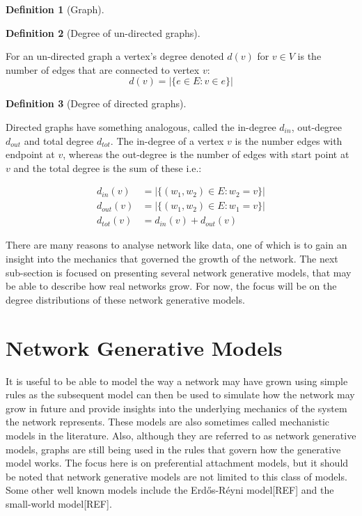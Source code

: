 \documentclass[
  10pt,
  a4paper,
]{scrreprt}
\theoremstyle{plain}
\theoremstyle{plain}
\theoremstyle{definition}
\newtheorem{definition}{Definition}[section]
\theoremstyle{plain}
\theoremstyle{remark}
\begin{document}
{\begin{definition}[Graph]
\end{definition}

\begin{definition}[Degree of un-directed
graphs]\protect\hypertarget{def-deg}{}\label{def-deg}

For an un-directed graph a vertex's degree denoted \(d(v)\) for
\(v\in V\) is the number of edges that are connected to vertex \(v\): \[
d(v) = |\{e\in E : v \in e\}|
\]

\end{definition}

\begin{definition}[Degree of directed
graphs]\protect\hypertarget{def-dirdeg}{}\label{def-dirdeg}

Directed graphs have something analogous, called the in-degree
\(d_{in}\), out-degree \(d_{out}\) and total degree \(d_{tot}\). The
in-degree of a vertex \(v\) is the number edges with endpoint at \(v\),
whereas the out-degree is the number of edges with start point at \(v\)
and the total degree is the sum of these i.e.:

\begin{align*}
d_{in}(v)&= |\{(w_1,w_2)\in E: w_2=v \}|\\
d_{out}(v) &= |\{(w_1,w_2)\in E: w_1=v \}|\\
d_{tot}(v) &= d_{in}(v) + d_{out}(v)
\end{align*}

\end{definition}

There are many reasons to analyse network like data, one of which is to
gain an insight into the mechanics that governed the growth of the
network. The next sub-section is focused on presenting several network
generative models, that may be able to describe how real networks grow.
For now, the focus will be on the degree distributions of these network
generative models.

\hypertarget{sec-gen}{%
\section{Network Generative Models}\label{sec-gen}}

It is useful to be able to model the way a network may have grown using
simple rules as the subsequent model can then be used to simulate how
the network may grow in future and provide insights into the underlying
mechanics of the system the network represents. These models are also
sometimes called mechanistic models in the literature. Also, although
they are referred to as network generative models, graphs are still
being used in the rules that govern how the generative model works. The
focus here is on preferential attachment models, but it should be noted
that network generative models are not limited to this class of models.
Some other well known models include the Erdős-Réyni model{[}REF{]} and
the small-world model{[}REF{]}.

}
\end{document}

